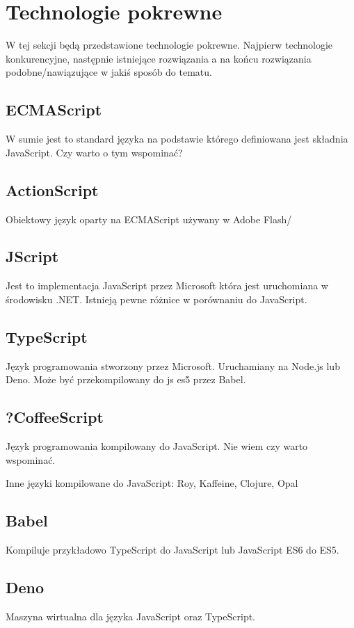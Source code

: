 \documentclass[a4paper]{article}
\begin{document}
\section{Technologie pokrewne}
W tej sekcji będą przedstawione technologie pokrewne.
Najpierw technologie konkurencyjne, następnie istniejące rozwiązania a na końcu rozwiązania podobne/nawiązujące w jakiś sposób do tematu.

\subsection{ECMAScript}
W sumie jest to standard języka na podstawie którego definiowana jest składnia JavaScript. Czy warto o tym wspominać?

\subsection{ActionScript}
Obiektowy język oparty na ECMAScript używany w Adobe Flash/

\subsection{JScript}
Jest to implementacja JavaScript przez Microsoft która jest uruchomiana w środowisku .NET.
Istnieją pewne różnice w porównaniu do JavaScript.

\subsection{TypeScript}
Język programowania stworzony przez Microsoft. Uruchamiany na Node.js lub Deno. Może być przekompilowany do js es5 przez Babel.

\subsection{?CoffeeScript}
Język programowania kompilowany do JavaScript.
Nie wiem czy warto wspominać.

Inne języki kompilowane do JavaScript: Roy, Kaffeine, Clojure, Opal

\subsection{Babel}
Kompiluje przykładowo TypeScript do JavaScript lub JavaScript ES6 do ES5.

\subsection{Deno}
Maszyna wirtualna dla języka JavaScript oraz TypeScript.
\end{document}
